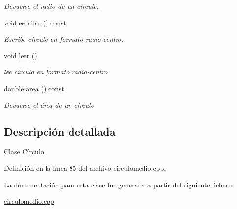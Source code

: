 \begin{DoxyCompactItemize}
\begin{DoxyCompactList}\small\item\em Devuelve el radio de un circulo. \end{DoxyCompactList}\item 
\hypertarget{classCirculo_a2deaed49ea394702beb0554f9480137e}{void \hyperlink{classCirculo_a2deaed49ea394702beb0554f9480137e}{escribir} () const }\label{classCirculo_a2deaed49ea394702beb0554f9480137e}

\begin{DoxyCompactList}\small\item\em Escribe círculo en formato radio-\/centro. \end{DoxyCompactList}\item 
\hypertarget{classCirculo_aa71efffb3b42eeaefd43743a8d34aa74}{void \hyperlink{classCirculo_aa71efffb3b42eeaefd43743a8d34aa74}{leer} ()}\label{classCirculo_aa71efffb3b42eeaefd43743a8d34aa74}

\begin{DoxyCompactList}\small\item\em lee círculo en formato radio-\/centro \end{DoxyCompactList}\item 
\hypertarget{classCirculo_a532d4f2bd03b688403c4370319411dc3}{double \hyperlink{classCirculo_a532d4f2bd03b688403c4370319411dc3}{area} () const }\label{classCirculo_a532d4f2bd03b688403c4370319411dc3}

\begin{DoxyCompactList}\small\item\em Devuelve el área de un círculo. \end{DoxyCompactList}\end{DoxyCompactItemize}


\subsection{Descripción detallada}
Clase Círculo. 

Definición en la línea 85 del archivo circulomedio.\-cpp.



La documentación para esta clase fue generada a partir del siguiente fichero\-:\begin{DoxyCompactItemize}
\item 
\hyperlink{circulomedio_8cpp}{circulomedio.\-cpp}\end{DoxyCompactItemize}
